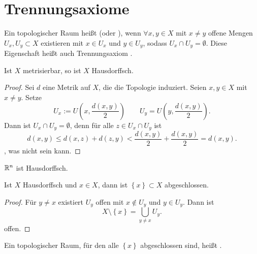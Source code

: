 \section{Trennungsaxiome}
\begin{definition}\label{def:hausdorff}
    Ein topologischer Raum heißt  (oder ), wenn $\forall x,y\in X$ mit $x\neq y$ offene Mengen $U_x, U_y\subset X$ existieren mit $x\in U_x$ und $y\in U_y$, sodass $U_x \cap U_y = \emptyset$. Diese Eigenschaft heißt auch Trennungsaxiom . \\
    \begin{minipage}{\textwidth}
    \centering    
\begin{minipage}{0.3\textwidth}
        \centering
    \end{minipage}
    \end{minipage}
\end{definition}

\begin{theorem}\label{thm:metrisierbarer-raum-ist-hausdorff}
    Ist $X$ metrisierbar, so ist  $X$ Hausdorffsch.
\end{theorem}
\begin{proof}
    Sei $d$ eine Metrik auf  $X$, die die Topologie induziert. Seien  $x,y\in X$ mit $x\neq y$. Setze
    \[
        U_x := U\left( x, \frac{d(x,y)}{2} \right) \qquad U_y = U\left( y, \frac{d(x,y)}{2} \right) 
    .\] 
    Dann ist $U_x \cap U_y = \emptyset$, denn für alle $z\in U_x \cap U_y$ ist
    \[
        d(x,y) \leq  d(x,z) + d(z,y) < \frac{d(x,y)}{2} + \frac{d(x,y)}{2} = d(x,y)
    .\] 
    , was nicht sein kann.
\end{proof}
\begin{example}
    $\mathbb{R}^n$ ist Hausdorffsch.
\end{example}
\begin{theorem}\label{thm:hausdorff-impliziert-t1}
    Ist $X$ Hausdorffsch und  $x\in X$, dann ist $\left \{x\right\} \subset X$ abgeschlossen.
    \label{thm:point-in-hausdorff-space-is-closed}
\end{theorem}
\begin{proof}
    Für $y\neq x$ existiert $U_y$ offen mit  $x\not\in U_y$ und $y\in U_y$. Dann ist
    \[
    X \setminus \left \{x\right\}  = \bigcup_{y\neq x} U_y 
    .\] 
    offen.
\end{proof}
\begin{remark}
    Ein topologischer Raum, für den alle $\left \{x\right\} $ abgeschlossen sind, heißt .
\end{remark}

